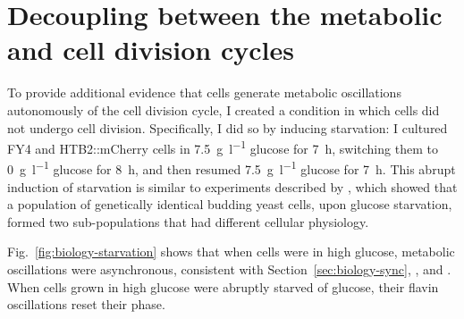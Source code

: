 \section{Decoupling between the metabolic and cell division cycles}
\label{sec:biology-abrupt}


To provide additional evidence that cells generate metabolic oscillations autonomously of the cell division cycle, I created a condition in which cells did not undergo cell division.
Specifically, I did so by inducing starvation: I cultured FY4 and HTB2::mCherry cells in \SI{7.5}{\gram~\litre^{-1}} glucose for \SI{7}{\hour}, switching them to \SI{0}{\gram~\litre^{-1}} glucose for \SI{8}{\hour}, and then resumed \SI{7.5}{\gram~\litre^{-1}} glucose for \SI{7}{\hour}.
This abrupt induction of starvation is similar to experiments described by \textcite{bagameryPutativeBetHedgingStrategy2020}, which showed that a population of genetically identical budding yeast cells, upon glucose starvation, formed two sub-populations that had different cellular physiology.

Fig.\ \ref{fig:biology-starvation} shows that when cells were in high glucose, metabolic oscillations were asynchronous, consistent with Section~\ref{sec:biology-sync}, \textcite{papagiannakisAutonomousMetabolicOscillations2017}, and \textcite{baumgartnerFlavinbasedMetabolicCycles2018}.
When cells grown in high glucose were abruptly starved of glucose, their flavin oscillations reset their phase.

